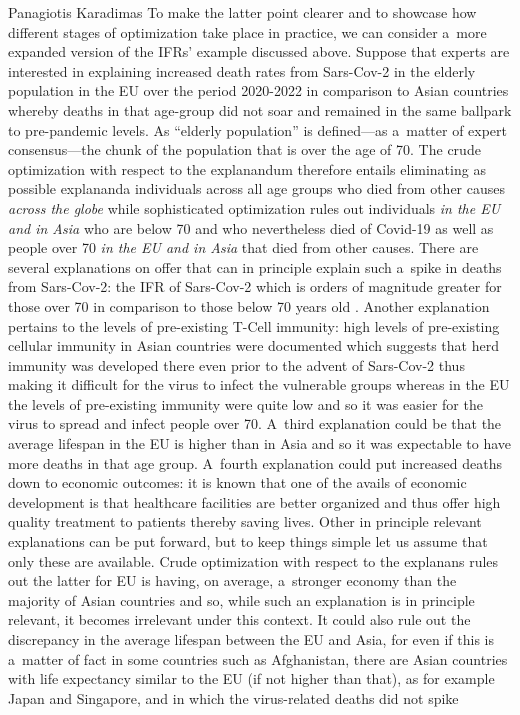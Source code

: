 \begin{artengenv}{Panagiotis Karadimas}
To make the latter point clearer and to showcase how different stages of optimization take place in practice, we can consider a~more expanded version of the IFRs' example discussed above. Suppose that experts are interested in explaining increased death rates from Sars-Cov-2 in the elderly population in the EU over the period 2020-2022 in comparison to Asian countries whereby deaths in that age-group did not soar and remained in the same ballpark to pre-pandemic levels. As ``elderly population'' is defined---as a~matter of expert consensus---the chunk of the population that is over the age of 70. The crude optimization with respect to the explanandum therefore entails eliminating as possible explananda individuals across all age groups who died from other causes \textit{across the globe} while sophisticated optimization rules out individuals \textit{in the EU and in Asia} who are below 70 and who nevertheless died of Covid-19 as well as people over 70 \textit{in the EU and in Asia} that died from other causes. There are several explanations on offer that can in principle explain such a~spike in deaths from Sars-Cov-2: the IFR of Sars-Cov-2 which is orders of magnitude greater for those over 70 in comparison to those below 70 years old
\parencite[][]{axfors_infection_2022}. %
 Another explanation pertains to the levels of pre-existing T-Cell immunity: high levels of pre-existing cellular immunity in Asian countries were documented 
\parencite[][]{bolourian_covid-19_2021} %
 which suggests that herd immunity was developed there even prior to the advent of Sars-Cov-2 
\parencite[][]{le_bert_highly_2021} %
 thus making it difficult for the virus to infect the vulnerable groups whereas in the EU the levels of pre-existing immunity were quite low and so it was easier for the virus to spread and infect people over 70. A~third explanation could be that the average lifespan in the EU is higher than in Asia and so it was expectable to have more deaths in that age group. A~fourth explanation could put increased deaths down to economic outcomes: it is known that one of the avails of economic development is that healthcare facilities are better organized and thus offer high quality treatment to patients thereby saving lives. Other in principle relevant explanations can be put forward, but to keep things simple let us assume that only these are available. Crude optimization with respect to the explanans rules out the latter for EU is having, on average, a~stronger economy than the majority of Asian countries and so, while such an explanation is in principle relevant, it becomes irrelevant under this context. It could also rule out the discrepancy in the average lifespan between the EU and Asia, for even if this is a~matter of fact in some countries such as Afghanistan, there are Asian countries with life expectancy similar to the EU (if not higher than that), as for example Japan and Singapore, and in which the virus-related deaths did not spike 

\end{artengenv}
